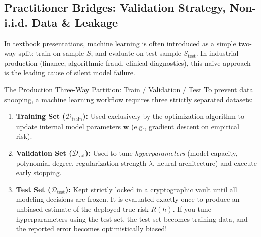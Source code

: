 \subsection{Practitioner Bridges: Validation Strategy, Non-i.i.d. Data \& Leakage}
\label{subsec:validation_strategy}

In textbook presentations, machine learning is often introduced as a simple two-way split: train on sample $S$, and evaluate on test sample $S_{\text{test}}$. In industrial production (finance, algorithmic fraud, clinical diagnostics), this naive approach is the leading cause of silent model failure.

\begin{definitionbox}{The Production Three-Way Partition: Train / Validation / Test}
To prevent data snooping, a machine learning workflow requires three strictly separated datasets:
\begin{enumerate}
    \item \textbf{Training Set ($\mathcal{D}_{\text{train}}$):} Used exclusively by the optimization algorithm to update internal model parameters $\mathbf{w}$ (e.g., gradient descent on empirical risk).
    \item \textbf{Validation Set ($\mathcal{D}_{\text{val}}$):} Used to tune \emph{hyperparameters} (model capacity, polynomial degree, regularization strength $\lambda$, neural architecture) and execute early stopping.
    \item \textbf{Test Set ($\mathcal{D}_{\text{test}}$):} Kept strictly locked in a cryptographic vault until all modeling decisions are frozen. It is evaluated exactly once to produce an unbiased estimate of the deployed true risk $R(h)$. If you tune hyperparameters using the test set, the test set becomes training data, and the reported error becomes optimistically biased!
\end{enumerate}
\end{definitionbox}

